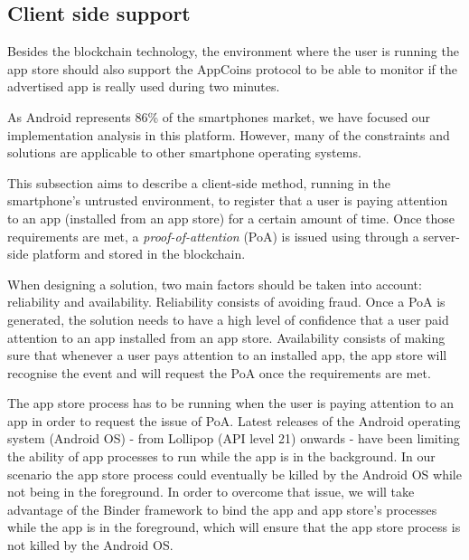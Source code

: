 \subsection{Client side support}

\label{sec:clientside}

Besides the blockchain technology, the environment where the user is running the app store should 
also support the AppCoins protocol to be able to monitor if the advertised app is really used during two minutes.

\medskip


As Android represents 86\% of the smartphones market, we have focused our implementation analysis in this
platform. However, many of the constraints and solutions are applicable to other smartphone operating systems.

\medskip

This subsection aims to describe a client-side method, running in the smartphone's untrusted environment, to register that a user is paying attention to an app (installed from an app store) for a certain amount of time. Once those requirements are met, a \textit{proof-of-attention} (\textsf{PoA}) is issued using through a server-side platform and stored in the blockchain.

\medskip

When designing a solution, two main factors should be taken into account: reliability and availability. 
Reliability consists of avoiding fraud. Once a \textsf{PoA} is generated, the solution needs to have a high level of 
confidence that a user paid attention to an app installed from an app store. Availability consists of 
making sure that whenever a user pays attention to an installed app, the app store 
will recognise the event and will request the \textsf{PoA} once the requirements are met. %

\medskip

The app store process has to be running when the user is paying attention to an app in order to request  
the issue of \textsf{PoA}. Latest releases of the Android operating system (Android OS) - from Lollipop (API level 21) onwards - have been limiting the ability of app processes to run while the app is in the 
background. In our scenario the app store process could eventually be killed by the Android OS while 
not being in the foreground. In order to overcome that issue, we will take advantage of the Binder 
framework to bind the app and app store's processes while the app is in the foreground, which will 
ensure that the app store process is not killed by the Android OS. 

